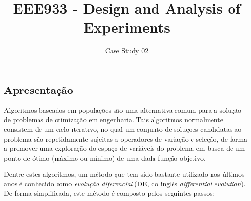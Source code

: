 \documentclass[11pt,twoside,printwatermark=false]{pinp}
\title{EEE933 - Design and Analysis of Experiments}
\author[]{Case Study 02}
\begin{document}
\verticaladjustment{-2pt}

\maketitle
\thispagestyle{firststyle}



\subsection{Apresentação}\label{apresentacao}

Algoritmos baseados em populações são uma alternativa comum para a
solução de problemas de otimização em engenharia. Tais algoritmos
normalmente consistem de um ciclo iterativo, no qual um conjunto de
soluções-candidatas ao problema são repetidamente sujeitas a operadores
de variação e seleção, de forma a promover uma exploração do espaço de
variáveis do problema em busca de um ponto de ótimo (máximo ou mínimo)
de uma dada função-objetivo.

Dentre estes algoritmos, um método que tem sido bastante utilizado nos
últimos anos é conhecido como \emph{evolução diferencial} (DE, do inglês
\emph{differential evolution})\citep{Storn1997}. De forma simplificada,
este método é composto pelos seguintes passos:
\end{document}
